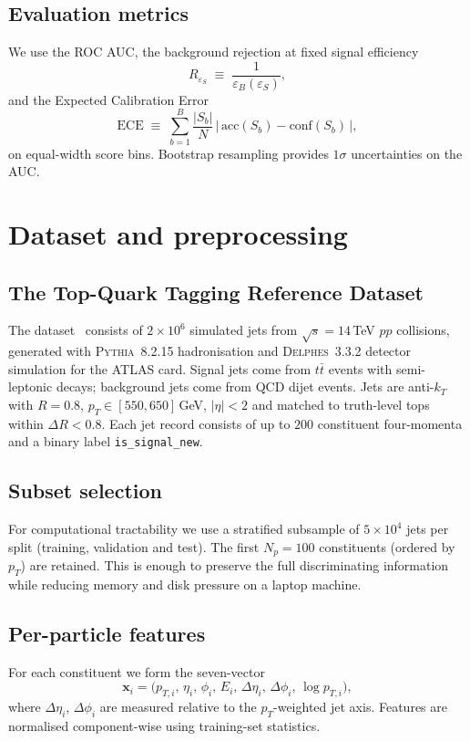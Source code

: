 \documentclass[12pt,a4paper,oneside]{report}
\begin{document}
\section{Evaluation metrics}
We use the ROC AUC, the background rejection at fixed signal
efficiency
\begin{equation}
    R_{\varepsilon_S}\;\equiv\;\frac{1}{\varepsilon_B(\varepsilon_S)},
\end{equation}
and the Expected Calibration Error
\begin{equation}
    \text{ECE}\;\equiv\;\sum_{b=1}^{B}\frac{|S_b|}{N}\,
    \bigl|\,\text{acc}(S_b)-\text{conf}(S_b)\,\bigr|,
\end{equation}
on equal-width score bins.  Bootstrap resampling provides $1\sigma$
uncertainties on the AUC.

\chapter{Dataset and preprocessing}\label{ch:data}

\section{The Top-Quark Tagging Reference Dataset}
The dataset~\cite{topref} consists of $2\!\times\!10^6$
simulated jets from $\sqrt{s}\!=\!14$\,TeV $pp$ collisions, generated
with \textsc{Pythia}~8.2.15 hadronisation and \textsc{Delphes}~3.3.2
detector simulation for the ATLAS card.  Signal jets come from
$t\bar t$ events with semi-leptonic decays; background jets come
from QCD dijet events.  Jets are anti-$k_T$ with $R\!=\!0.8$,
$p_T\!\in\![550,650]$\,GeV, $|\eta|\!<\!2$ and matched to truth-level
tops within $\Delta R\!<\!0.8$.  Each jet record consists of up to
$200$ constituent four-momenta and a binary label
\texttt{is\_signal\_new}.

\section{Subset selection}
For computational tractability we use a stratified subsample of
$5\!\times\!10^4$ jets per split (training, validation and test).
The first $N_p\!=\!100$ constituents (ordered by $p_T$) are
retained.  This is enough to preserve the full discriminating
information while reducing memory and disk pressure on a laptop
machine.

\section{Per-particle features}
For each constituent we form the seven-vector
\begin{equation}
    \mathbf{x}_i = \bigl(p_{T,i},\,\eta_i,\,\phi_i,\,E_i,\,
                          \Delta\eta_i,\,\Delta\phi_i,\,
                          \log p_{T,i}\bigr),
\end{equation}
where $\Delta\eta_i$, $\Delta\phi_i$ are measured relative to the
$p_T$-weighted jet axis.  Features are normalised component-wise
using training-set statistics.
\end{document}
